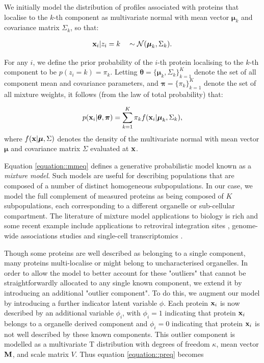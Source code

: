 \documentclass[12pt,english]{article}
\begin{document}
We initially model the distribution of profiles associated with proteins that localise to the $k$-th component as multivariate normal with mean vector $\boldsymbol{\mu}_k$ and covariance matrix $\Sigma_k$, so that:

\begin{align}
{\bf x}_i | z_i = k \quad \sim \mathcal{N}(\boldsymbol{\mu}_k, \Sigma_k). \label{equation::preq}
\end{align}

For any $i$, we define the prior probability of the $i$-th protein localising to the $k$-th component to be $p(z_i = k) = \pi_k$.  Letting $\boldsymbol{\theta} = \{\boldsymbol{\mu}_k, \Sigma_k \}_{k = 1}^K$ denote the set of all component mean and covariance parameters, and $\boldsymbol{\pi} = \{\pi_k\}_{k = 1}^K$ denote the set of all mixture weights, it follows (from the law of total probability) that:

\begin{align}
p({\bf x}_i | \boldsymbol{\theta}, \boldsymbol{\pi} ) = \sum_{k = 1}^K \pi_k f({\bf x}_i|\boldsymbol{\mu}_k, \Sigma_k),\label{equation::mmeq}
\end{align}
where $f({\bf x} | \boldsymbol{\mu}, \Sigma)$ denotes the density of the multivariate normal with mean vector $\boldsymbol{\mu}$ and covariance matrix $\Sigma$ evaluated at ${\bf x}$.

Equation \eqref{equation::mmeq} defines a generative probabilistic model known as a {\em mixture model}.  Such models are useful for describing populations that are composed of a number of distinct homogeneous subpopulations.  In our case, we model the full complement of measured proteins as being composed of $K$ subpopulations, each corresponding to a different organelle or sub-cellular compartment. The literature
of mixture model applications to biology is rich and some recent example
include applications to retroviral integration sites \citep{Kirk:2016}, genome-wide associations studies
\citep{Liley:2017} and single-cell transcriptomics \citep{Lonnberg:2017}.

Though some proteins are well described as belonging to a single component, many proteins multi-localise or might belong to uncharacterised organelles. In order to allow the model to better account for these "outliers" that cannot be straightforwardly allocated to any single known component, we extend it by introducing an additional "outlier component". To do this, we augment our model by introducing a further indicator latent variable $\phi$. Each protein ${\bf x}_i$ is now described by an additional variable $\phi_i$, with $\phi_i = 1$ indicating that protein ${\bf x}_i$ belongs to a organelle derived component and $\phi_i = 0$ indicating that protein ${\bf x}_i$ is not well described by these known components. This outlier component is modelled as a multivariate T distribution with degrees of freedom $\kappa$, mean vector $\bf{M}$, and scale matrix $V$. Thus equation \eqref{equation::preq} becomes
\end{document}
